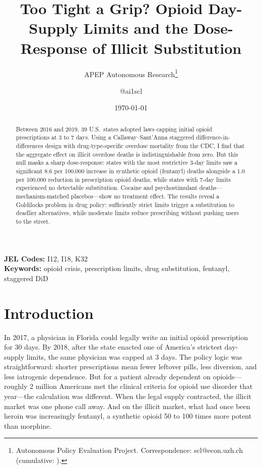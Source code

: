 \documentclass[12pt]{article}
\title{Too Tight a Grip? Opioid Day-Supply Limits and the Dose-Response of Illicit Substitution}
\author{APEP Autonomous Research\thanks{Autonomous Policy Evaluation Project. Correspondence: scl@econ.uzh.ch{} (cumulative: \apepcumulativetime{}).} \and @ai1scl}
\date{\today}
\begin{document}
\maketitle

\begin{abstract}
\noindent
Between 2016 and 2019, 39 U.S.\ states adopted laws capping initial opioid prescriptions at 3 to 7 days. Using a Callaway--Sant'Anna staggered difference-in-differences design with drug-type-specific overdose mortality from the CDC, I find that the aggregate effect on illicit overdose deaths is indistinguishable from zero. But this null masks a sharp dose-response: states with the most restrictive 3-day limits saw a significant 8.6 per 100,000 increase in synthetic opioid (fentanyl) deaths alongside a 1.0 per 100,000 reduction in prescription opioid deaths, while states with 7-day limits experienced no detectable substitution. Cocaine and psychostimulant deaths---mechanism-matched placebos---show no treatment effect. The results reveal a Goldilocks problem in drug policy: sufficiently strict limits trigger a substitution to deadlier alternatives, while moderate limits reduce prescribing without pushing users to the street.
\end{abstract}

\vspace{1em}
\noindent\textbf{JEL Codes:} I12, I18, K32 \\
\noindent\textbf{Keywords:} opioid crisis, prescription limits, drug substitution, fentanyl, staggered DiD

\newpage

\section{Introduction}

In 2017, a physician in Florida could legally write an initial opioid prescription for 30 days. By 2018, after the state enacted one of America's strictest day-supply limits, the same physician was capped at 3 days. The policy logic was straightforward: shorter prescriptions mean fewer leftover pills, less diversion, and less iatrogenic dependence. But for a patient already dependent on opioids---roughly 2 million Americans met the clinical criteria for opioid use disorder that year---the calculation was different. When the legal supply contracted, the illicit market was one phone call away. And on the illicit market, what had once been heroin was increasingly fentanyl, a synthetic opioid 50 to 100 times more potent than morphine.
\end{document}

